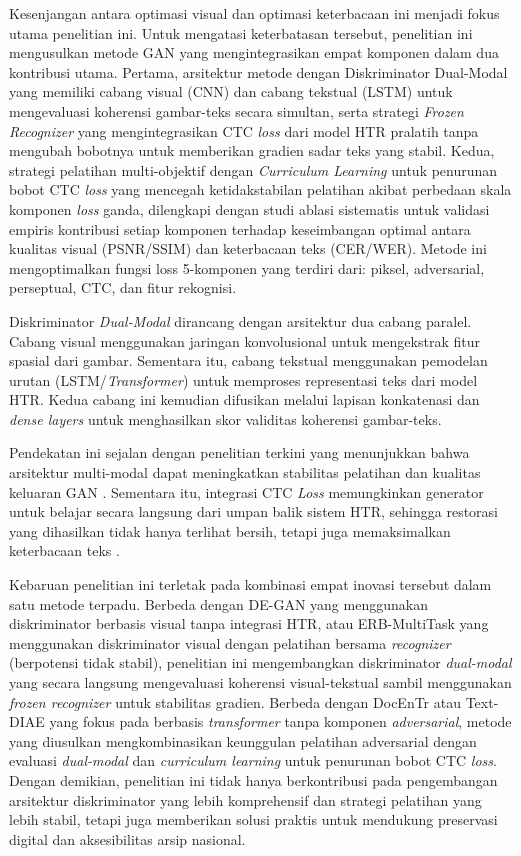 Kesenjangan antara optimasi visual dan optimasi keterbacaan ini menjadi fokus utama penelitian ini. Untuk mengatasi keterbatasan tersebut, penelitian ini mengusulkan metode GAN yang mengintegrasikan empat komponen dalam dua kontribusi utama. Pertama, arsitektur metode dengan Diskriminator Dual-Modal yang memiliki cabang visual (CNN) dan cabang tekstual (LSTM) untuk mengevaluasi koherensi gambar-teks secara simultan, serta strategi \textit{Frozen Recognizer} yang mengintegrasikan CTC \textit{loss} dari model HTR pralatih tanpa mengubah bobotnya untuk memberikan gradien sadar teks yang stabil. Kedua, strategi pelatihan multi-objektif dengan \textit{Curriculum Learning} untuk penurunan bobot CTC \textit{loss} yang mencegah ketidakstabilan pelatihan akibat perbedaan skala komponen \textit{loss} ganda, dilengkapi dengan studi ablasi sistematis untuk validasi empiris kontribusi setiap komponen terhadap keseimbangan optimal antara kualitas visual (PSNR/SSIM) dan keterbacaan teks (CER/WER). Metode ini mengoptimalkan fungsi loss 5-komponen yang terdiri dari: piksel, adversarial, perseptual, CTC, dan fitur rekognisi.


Diskriminator \textit{Dual-Modal} dirancang dengan arsitektur dua cabang paralel. Cabang visual menggunakan jaringan konvolusional untuk mengekstrak fitur spasial dari gambar. Sementara itu, cabang tekstual menggunakan pemodelan urutan (LSTM/\textit{Transformer}) untuk memproses representasi teks dari model HTR. Kedua cabang ini kemudian difusikan melalui lapisan konkatenasi dan \textit{dense layers} untuk menghasilkan skor validitas koherensi gambar-teks.


Pendekatan ini sejalan dengan penelitian terkini yang menunjukkan bahwa arsitektur multi-modal dapat meningkatkan stabilitas pelatihan dan kualitas keluaran GAN \parencite{baltrusaitis2019}. Sementara itu, integrasi CTC \textit{Loss} memungkinkan generator untuk belajar secara langsung dari umpan balik sistem HTR, sehingga restorasi yang dihasilkan tidak hanya terlihat bersih, tetapi juga memaksimalkan keterbacaan teks \parencite{graves2006}.


Kebaruan penelitian ini terletak pada kombinasi empat inovasi tersebut dalam satu metode terpadu. Berbeda dengan DE-GAN yang menggunakan diskriminator berbasis visual tanpa integrasi HTR, atau ERB-MultiTask yang menggunakan diskriminator visual dengan pelatihan bersama \textit{recognizer} (berpotensi tidak stabil), penelitian ini mengembangkan diskriminator \textit{dual-modal} yang secara langsung mengevaluasi koherensi visual-tekstual sambil menggunakan \textit{frozen recognizer} untuk stabilitas gradien. Berbeda dengan DocEnTr atau Text-DIAE yang fokus pada berbasis \textit{transformer} tanpa komponen \textit{adversarial}, metode yang diusulkan mengkombinasikan keunggulan pelatihan adversarial dengan evaluasi \textit{dual-modal} dan \textit{curriculum learning} untuk penurunan bobot CTC \textit{loss}. Dengan demikian, penelitian ini tidak hanya berkontribusi pada pengembangan arsitektur diskriminator yang lebih komprehensif dan strategi pelatihan yang lebih stabil, tetapi juga memberikan solusi praktis untuk mendukung preservasi digital dan aksesibilitas arsip nasional.


